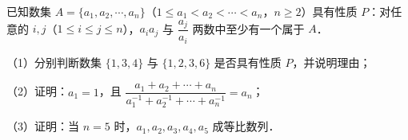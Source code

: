 \begin{question}
已知数集 $A=\{a_1,a_2,\cdots,a_n\}$（$1\leqslant a_1<a_2<\cdots<a_n$，$n\geqslant2$）具有性质 $P$：对任意的 $i,j$（$1\leqslant i\leqslant j\leqslant n$），$a_ia_j$ 与 $\dfrac{a_j}{a_i}$ 两数中至少有一个属于 $A$．

（1）分别判断数集 $\{1,3,4\}$ 与 $\{1,2,3,6\}$ 是否具有性质 $P$，并说明理由；

（2）证明：$a_1=1$，且 $\dfrac{a_1+a_2+\cdots+a_n}{a_1^{-1}+a_2^{-1}+\cdots+a_n^{-1}}=a_n$；

（3）证明：当 $n=5$ 时，$a_1,a_2,a_3,a_4,a_5$ 成等比数列．

\end{question}